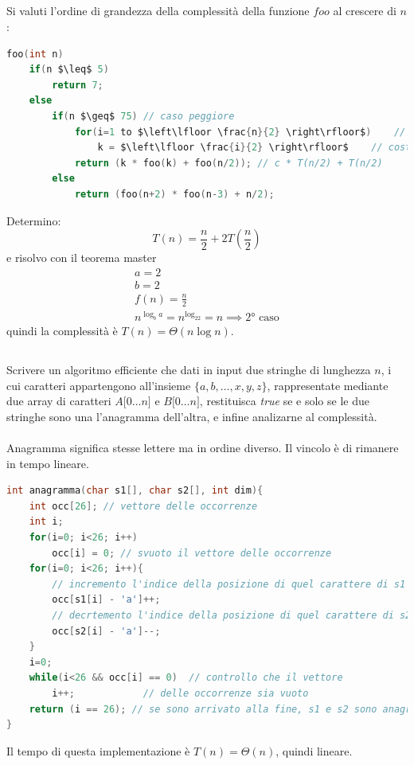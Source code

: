 \documentclass[italian]{article}
\newcommand{\fn}{f(n)}
\newcommand{\exercize}{\text{\faPencil $\;$ Esercizio }}
\newcommand{\homeExercize}{\text{\faHome $\;$ Esercizio per casa}}
\begin{document}
\subsection{\homeExercize}
Si valuti l'ordine di grandezza della complessità della funzione $foo$ al crescere di $n$:
\begin{lstlisting}[language=c,mathescape=true]
foo(int n)
	if(n $\leq$ 5)
		return 7;
	else
		if(n $\geq$ 75)	// caso peggiore
			for(i=1 to $\left\lfloor \frac{n}{2} \right\rfloor$)	// n/2 volte
				k = $\left\lfloor \frac{i}{2} \right\rfloor$	// costante
			return (k * foo(k) + foo(n/2)); // c * T(n/2) + T(n/2)
		else
			return (foo(n+2) * foo(n-3) + n/2);
\end{lstlisting}
Determino:
\[
	T(n) = \frac{n}{2} + 2T\left(\frac{n}{2}\right)
\]
e risolvo con il teorema master
\begin{gather*}
	a = 2 \\
	b = 2 \\
	\fn = \frac{n}{2} \\
	n^{\log_ba} = n^{\log_22} = n \implies \text{2° caso}
\end{gather*}
quindi la complessità è $T(n) = \varTheta(n \log n)$.

\subsection{\exercize}
Scrivere un algoritmo efficiente che dati in input due stringhe di lunghezza $n$, i cui caratteri appartengono all'insieme $\{ a,b,\dots,x,y,z \}$, rappresentate mediante due array di caratteri $A\lbrack 0 \dots n \rbrack$ e $B\lbrack 0 \dots n \rbrack$, restituisca \textit{true} se e solo se le due stringhe sono una l'anagramma dell'altra, e infine analizarne al complessità. \\\\
Anagramma significa stesse lettere ma in ordine diverso. Il vincolo è di rimanere in tempo lineare.
\begin{lstlisting}[language=c,mathescape=true]
int anagramma(char s1[], char s2[], int dim){
	int occ[26]; // vettore delle occorrenze
	int i;
	for(i=0; i<26; i++)
		occ[i] = 0; // svuoto il vettore delle occorrenze
	for(i=0; i<26; i++){
		// incremento l'indice della posizione di quel carattere di s1
		occ[s1[i] - 'a']++; 
		// decrtemento l'indice della posizione di quel carattere di s2
		occ[s2[i] - 'a']--;
	}
	i=0;
	while(i<26 && occ[i] == 0) 	// controllo che il vettore 
		i++;			// delle occorrenze sia vuoto
	return (i == 26); // se sono arrivato alla fine, s1 e s2 sono anagrammi
}
\end{lstlisting}
Il tempo di questa implementazione è $T(n) = \varTheta(n)$, quindi lineare.
\pagebreak
\end{document}
